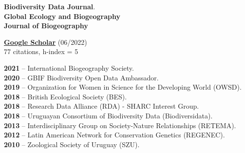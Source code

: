 \documentclass[9pt]{developercv} %
\begin{document}
\begin{minipage}[t]{0.35\textwidth}
	\vspace{-\baselineskip} %
	
	\textbf{Biodiversity Data Journal}.\\
	\textbf{Global Ecology and Biogeography}\\
	\textbf{Journal of Biogeography}


	\textbf{\href{https://scholar.google.com/citations?user=9KCM81IAAAAJ&hl}{Google Scholar}} (06/2022)\\
	77 citations, h-index = 5\\
\end{minipage} 
\hfill
\begin{minipage}[t]{0.65\textwidth}
	\vspace{-\baselineskip} %


	\textbf{2021} -- International Biogeography Society.\\
	\textbf{2020} -- GBIF Biodiversity Open Data Ambassador.\\
	\textbf{2019} -- Organization for Women in Science for the Developing World (OWSD).\\
	\textbf{2018} -- British Ecological Society (BES).\\ 
	\textbf{2018} -- Research Data Alliance (RDA) - SHARC Interest Group.\\ 
	\textbf{2018} -- Uruguayan Consortium of Biodiversity Data (Biodiversidata).\\ 
	\textbf{2013} -- Interdisciplinary Group on Society-Nature Relationships (RETEMA).\\
	\textbf{2012} -- Latin American Network for Conservation Genetics (REGENEC).\\
	\textbf{2010} -- Zoological Society of Uruguay (SZU).\\\\
	
\end{minipage} 



\end{document}

